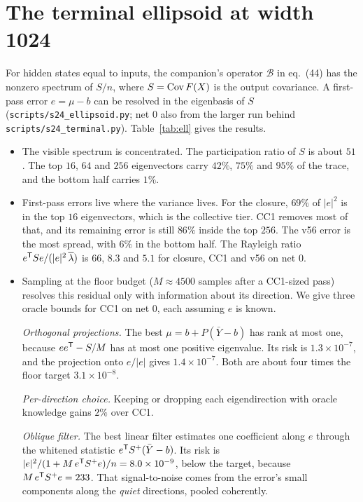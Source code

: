 \section{The terminal ellipsoid at width 1024}\label{sec:ell}

For hidden states equal to inputs, the companion's operator $\mathcal B$ in eq.~(44) has the nonzero spectrum of $S/n$,
where $S=\operatorname{Cov} F(X)$ is the output covariance. A first-pass error $e=\mu-b$ can be resolved in the eigenbasis of $S$
(\texttt{scripts/s24\_ellipsoid.py}; net 0 also from the larger run behind \texttt{scripts/s24\_terminal.py}).
Table~\ref{tab:ell} gives the results.

\begin{itemize}[leftmargin=1.5em]
\item The visible spectrum is concentrated. The participation ratio of $S$ is about $51$. The top $16$, $64$ and $256$
eigenvectors carry $42\%$, $75\%$ and $95\%$ of the trace, and the bottom half carries $1\%$.
\item First-pass errors live where the variance lives. For the closure, $69\%$ of $|e|^2$ is in the top $16$ eigenvectors,
which is the collective tier. CC1 removes most of that, and its remaining error is still $86\%$ inside the top $256$. The
v56 error is the most spread, with $6\%$ in the bottom half. The Rayleigh ratio $e^{\mathsf T} Se/(|e|^2\,\overline\lambda)$ is
$66$, $8.3$ and $5.1$ for closure, CC1 and v56 on net 0.
\item Sampling at the floor budget ($M\approx4500$ samples after a CC1-sized pass) resolves this residual only with
information about its direction. We give three oracle bounds for CC1 on net 0, each assuming $e$ is known.

\emph{Orthogonal projections.} The best $\mu=b+P(\bar Y-b)$ has rank at most one, because $ee^{\mathsf T}-S/M$ has at most one
positive eigenvalue. Its risk is $1.3\times10^{-7}$, and the projection onto $e/|e|$ gives $1.4\times10^{-7}$. Both are
about four times the floor target $3.1\times10^{-8}$.

\emph{Per-direction choice.} Keeping or dropping each eigendirection with oracle knowledge gains $2\%$ over CC1.

\emph{Oblique filter.} The best linear filter estimates one coefficient along $e$ through the whitened statistic
$e^{\mathsf T} S^{+}(\bar Y-b)$. Its risk is $|e|^2/(1+M\,e^{\mathsf T} S^{+}e)/n=8.0\times10^{-9}$, below the target, because
$M\,e^{\mathsf T} S^{+}e=233$. That signal-to-noise comes from the error's small components along the \emph{quiet} directions,
pooled coherently.


\end{itemize}
